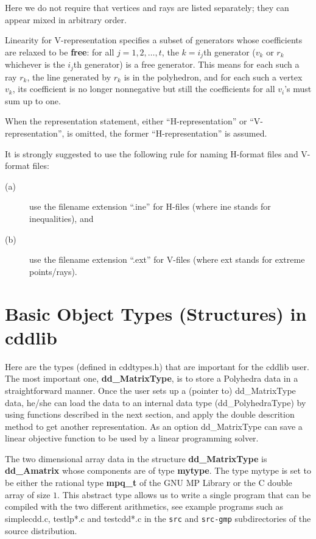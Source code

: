 \documentclass[11pt]{article}
\newcommand {\0} {{\bf 0}}
\begin{document}
\bigskip
\noindent
Here we do not require that
vertices and rays are listed
separately; they can appear mixed in arbitrary
order.

Linearity for V-representation specifies a subset of generators
whose coefficients are relaxed
to be {\bf free}:  for all $j=1,2, \ldots, t$, the $k=i_j$th generator ($v_{k}$ or $r_k$ whichever is the $i_j$th generator) is a free generator. 
This means for each such a ray $r_k$, 
the line generated by $r_k$ is in the polyhedron,
and for each such a vertex $v_k$, its coefficient is no longer nonnegative
but still the coefficients for all $v_i$'s must sum up to one. 

When the representation statement, either ``H-representation''
or ``V-representation'', is omitted, the former
``H-representation'' is assumed.

It is strongly suggested to use the following rule for naming
H-format files and V-format files:   
\begin{description}
\item[(a)] use the filename  extension ``.ine'' for H-files (where ine stands for inequalities), and 
\item[(b)]  use the filename  extension ``.ext'' for V-files (where ext stands for extreme points/rays). 
\end{description}


\section{Basic Object Types (Structures) in cddlib}  \label{DATASTR}

Here are the types (defined in cddtypes.h) that are 
important for the cddlib user.  The most important one, 
{\bf dd\_MatrixType\/},
is to store a Polyhedra data in a straightforward manner.
Once the user sets up a (pointer to) dd\_MatrixType data,
he/she can load the data to an internal data type (dd\_PolyhedraType)
by using functions described in the next section, and apply
the double descrition method to get another representation.
As an option dd\_MatrixType can save a linear objective function
to be used by a linear programming solver.

The two dimensional array data in the structure {\bf dd\_MatrixType\/} is
{\bf dd\_Amatrix\/} whose components are of type {\bf mytype\/}.
The type mytype is set to be either the rational type {\bf mpq\_t} of 
the GNU MP Library or the C double array of size $1$.
This abstract type allows us to write a single program that can
be compiled with the two different arithmetics, see example
programs such as simplecdd.c, testlp*.c and testcdd*.c
in the {\tt src} and {\tt src-gmp} subdirectories of the source
distribution.
\end{document}
